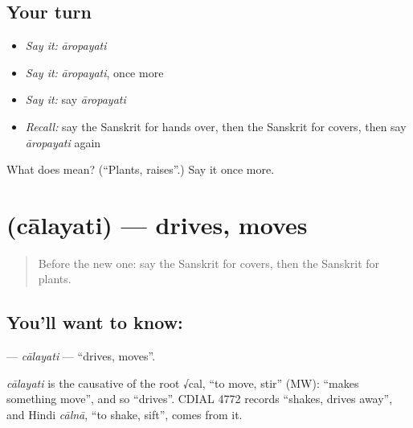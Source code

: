 \subsection*{Your turn}
\begin{itemize}
\raggedright
  \item \emph{Say it:} \emph{āropayati}
  \item \emph{Say it:} \emph{āropayati}, once more
  \item \emph{Say it:} say \emph{āropayati}
  \item \emph{Recall:} say the Sanskrit for hands over, then the Sanskrit for covers, then say \emph{āropayati} again
\end{itemize}

\begin{tcolorbox}[breakable,colback=teal!4,colframe=teal!35!black,title={Before you move on}]
What does  mean? (\textquotedblleft{}Plants, raises\textquotedblright{}.) Say it once more.
\end{tcolorbox}
\section[\texorpdfstring{\sk{चालयति} (cālayati)}{चालयति (cālayati)}]{ (cālayati) — drives, moves}

\label{lesson:SA-C235-calayati}



\begin{quote}
Before the new one: say the Sanskrit for covers, then the Sanskrit for plants.
\end{quote}

\subsection*{You'll want to know: }
\textbf{} — \emph{cālayati} — \textquotedblleft{}drives, moves\textquotedblright{}.

\begin{cousinweb}
\emph{cālayati} is the causative of the root √cal, \textquotedblleft{}to move, stir\textquotedblright{} (MW): \textquotedblleft{}makes something move\textquotedblright{}, and so \textquotedblleft{}drives\textquotedblright{}. CDIAL 4772 records \textquotedblleft{}shakes, drives away\textquotedblright{}, and Hindi \emph{cālnā}, \textquotedblleft{}to shake, sift\textquotedblright{}, comes from it.
\end{cousinweb}

